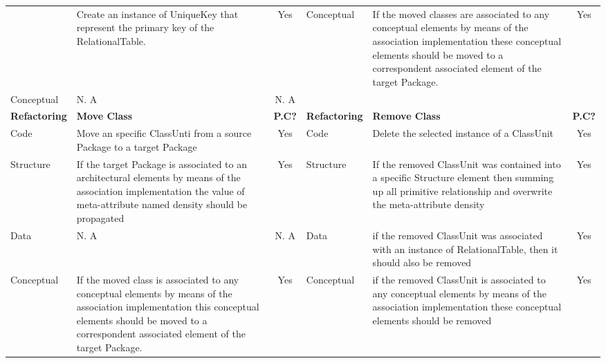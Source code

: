 \begin{table}
{\begin{tabular}{|l|>{\raggedright}p{7cm}|c|l|>{\raggedright}p{7cm}|c|}
\cline{2-6} 
 & {\footnotesize{Create an instance of UniqueKey that represent the
primary key of the RelationalTable.}} & {\footnotesize{Yes}} & \multirow{2}{*}{{\footnotesize{Conceptual}}} & {\footnotesize{If the moved classes are associated to any conceptual
elements by means of the association implementation these conceptual
elements should be moved to a correspondent associated element of
the target Package.}} & \multirow{2}{*}{{\footnotesize{Yes}}}\tabularnewline
\cline{1-3} 
{\footnotesize{Conceptual}} & {\footnotesize{N. A}} & {\footnotesize{N. A}} &  &  & \tabularnewline
\hline 
\textbf{{\footnotesize{\cellcolor{gray!40}Refactoring}}} & {\textbf{\footnotesize{\cellcolor{gray!40}Move Class}}} & {\textbf{\footnotesize{\cellcolor{gray!40}P.C?}}} & {\textbf{\footnotesize{\cellcolor{gray!40}Refactoring}}} & {\textbf{\footnotesize{\cellcolor{gray!40}Remove Class}}} & {\textbf{\footnotesize{\cellcolor{gray!40}P.C?}}}\tabularnewline
\hline 
{\footnotesize{Code}} & {\footnotesize{Move an specific ClassUnti from a source Package to
a target Package}} & {\footnotesize{Yes}} & {\footnotesize{Code}} & {\footnotesize{Delete the selected instance of a ClassUnit}} & {\footnotesize{Yes}}\tabularnewline
\hline 
{\footnotesize{Structure}} & {\footnotesize{If the target Package is associated to an architectural
elements by means of the association implementation the value of meta-attribute
named density should be propagated}} & {\footnotesize{Yes}} & {\footnotesize{Structure}} & {\footnotesize{If the removed ClassUnit was contained into a specific
Structure element then summing up all primitive relationship and overwrite
the meta-attribute density}} & {\footnotesize{Yes}}\tabularnewline
\hline 
{\footnotesize{Data}} & {\footnotesize{N. A}} & {\footnotesize{N. A}} & {\footnotesize{Data}} & {\footnotesize{if the removed ClassUnit was associated with an instance
of RelationalTable, then it should also be removed}} & {\footnotesize{Yes}}\tabularnewline
\hline 
{\footnotesize{Conceptual}} & {\footnotesize{If the moved class is associated to any conceptual
elements by means of the association implementation this conceptual
elements should be moved to a correspondent associated element of
the target Package.}} & {\footnotesize{Yes}} & {\footnotesize{Conceptual}} & {\footnotesize{if the removed ClassUnit is associated to any conceptual
elements by means of the association implementation these conceptual
elements should be removed}} & {\footnotesize{Yes}}\tabularnewline
\hline 
\end{tabular}}
\end{table}
